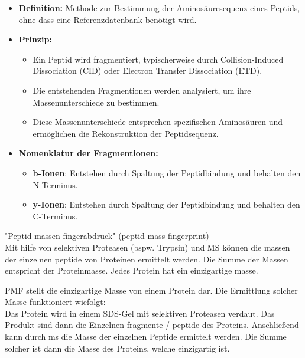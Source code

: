 \begin{itemize}
    \item \textbf{Definition:} Methode zur Bestimmung der Aminosäuresequenz eines Peptids, ohne dass eine Referenzdatenbank benötigt wird.
    \item \textbf{Prinzip:}
    \begin{itemize}
        \item Ein Peptid wird fragmentiert, typischerweise durch Collision-Induced Dissociation (CID) oder Electron Transfer Dissociation (ETD).
        \item Die entstehenden Fragmentionen werden analysiert, um ihre Massenunterschiede zu bestimmen.
        \item Diese Massenunterschiede entsprechen spezifischen Aminosäuren und ermöglichen die Rekonstruktion der Peptidsequenz.
    \end{itemize}
    \item \textbf{Nomenklatur der Fragmentionen:}
    \begin{itemize}
        \item \textbf{b-Ionen}: Entstehen durch Spaltung der Peptidbindung und behalten den N-Terminus.
        \item \textbf{y-Ionen}: Entstehen durch Spaltung der Peptidbindung und behalten den C-Terminus.
    \end{itemize}
\end{itemize}

\begin{mechanism}[title=Definition PMF]
"Peptid massen fingerabdruck" (peptid mass fingerprint) \\
Mit hilfe von selektiven Proteasen (bspw. \gls{Trypsin}) und MS können die massen der einzelnen peptide von Proteinen ermittelt werden. Die Summe der Massen entspricht der Proteinmasse. Jedes Protein hat ein einzigartige masse.
\end{mechanism}
\begin{mechanism}[title=Wie erhält man PMF und was stellt es dar?]
PMF stellt die einzigartige Masse von einem Protein dar. Die Ermittlung solcher Masse funktioniert wiefolgt: \\
Das Protein wird in einem SDS-Gel mit selektiven Proteasen verdaut. Das Produkt sind dann die Einzelnen fragmente / peptide des Proteins. Anschließend kann durch \gls{ms} die Masse der einzelnen Peptide ermittelt werden. Die Summe solcher ist dann die Masse des Proteins, welche einzigartig ist.
\end{mechanism}

